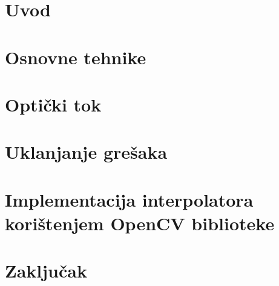 \documentclass[12pt]{report}
\newcommand{\ch}{č}
\newcommand{\sh}{š}
\begin{document}
\tableofcontents

\chapter{Uvod}


\chapter{Osnovne tehnike}


\chapter{Opti\ch ki tok}


\chapter{Uklanjanje gre\sh aka}


\chapter{Implementacija interpolatora kori\sh tenjem OpenCV biblioteke}


\chapter{Zaklju\ch ak}
\end{document}
